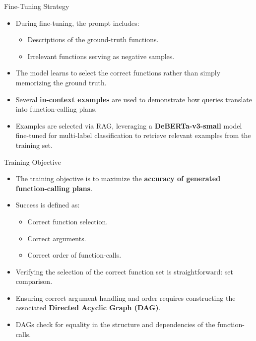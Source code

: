 \documentclass{beamer}
\begin{document}
\begin{frame}{Fine-Tuning Strategy}
    \begin{itemize}
        \item During fine-tuning, the prompt includes:
        \begin{itemize}
            \item Descriptions of the ground-truth functions.
            \item Irrelevant functions serving as negative samples.
        \end{itemize}
        \item The model learns to select the correct functions rather than simply memorizing the ground truth.
        \item Several \textbf{in-context examples} are used to demonstrate how queries translate into function-calling plans.
        \item Examples are selected via RAG, leveraging a \textbf{DeBERTa-v3-small} model \citep{he2021debertav3} fine-tuned for multi-label classification to retrieve relevant examples from the training set.
    \end{itemize}
\end{frame}

\begin{frame}{Training Objective}
    \begin{itemize}
        \item The training objective is to maximize the \textbf{accuracy of generated function-calling plans}.
        \item Success is defined as:
        \begin{itemize}
            \item Correct function selection.
            \item Correct arguments.
            \item Correct order of function-calls.
        \end{itemize}
        \item Verifying the selection of the correct function set is straightforward: set comparison.
        \item Ensuring correct argument handling and order requires constructing the associated \textbf{Directed Acyclic Graph (DAG)}.
        \item DAGs check for equality in the structure and dependencies of the function-calls.
    \end{itemize}
\end{frame}
\end{document}
